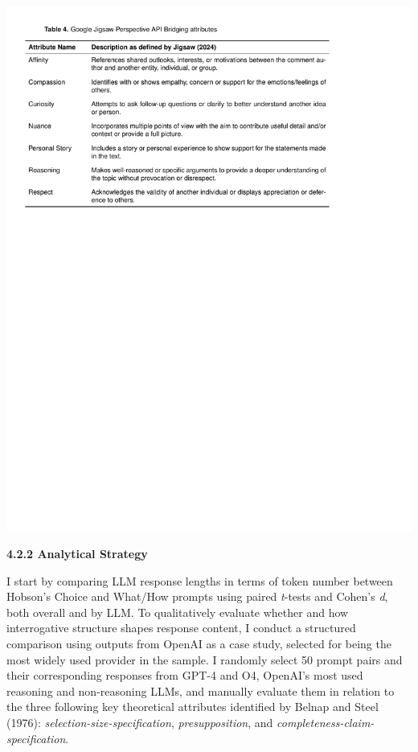 \documentclass[
  12pt,
]{article}
\begin{document}
\begin{center}\includegraphics{../03_outputs/03_experimental_analyses/table_4} \end{center}

\textbf{4.2.2 Analytical Strategy}

I start by comparing LLM response lengths in terms of token number between Hobson's Choice and What/How prompts using paired \emph{t}-tests and Cohen's \emph{d}, both overall and by LLM. To qualitatively evaluate whether and how interrogative structure shapes response content, I conduct a structured comparison using outputs from OpenAI as a case study, selected for being the most widely used provider in the sample. I randomly select 50 prompt pairs and their corresponding responses from GPT-4 and O4, OpenAI's most used reasoning and non-reasoning LLMs, and manually evaluate them in relation to the three following key theoretical attributes identified by Belnap and Steel (1976): \emph{selection-size-specification}, \emph{presupposition}, and \emph{completeness-claim-specification}.
\end{document}
